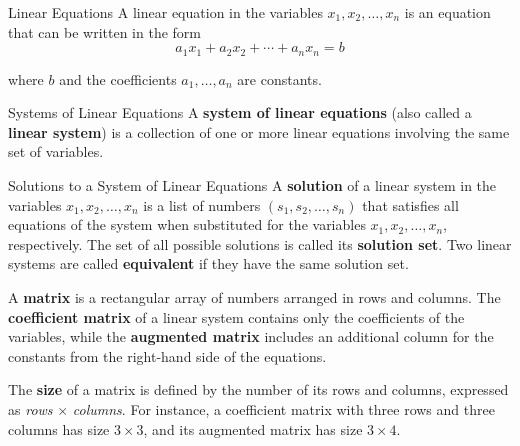 

\begin{definition}{Linear Equations} A linear equation in the variables $x_1, x_2, \ldots, x_n$ is an equation that can be written in the form
\[
a_1 x_1 + a_2 x_2 + \cdots + a_n x_n = b
\]

where $b$ and the coefficients $a_1, \ldots, a_n$ are constants.

\end{definition}

\begin{definition}{Systems of Linear Equations} A \textbf{system of linear equations} (also called a \textbf{linear system}) is a collection of one or more linear equations involving the same set of variables. \end{definition}

\begin{definition}{Solutions to a System of Linear Equations} A \textbf{solution} of a linear system in the variables $x_1, x_2, \ldots, x_n$ is a list of numbers $(s_1, s_2, \ldots, s_n)$ that satisfies all equations of the system when substituted for the variables $x_1, x_2, \ldots, x_n$, respectively. The set of all possible solutions is called its \textbf{solution set}. Two linear systems are called \textbf{equivalent} if they have the same solution set. \end{definition}

\begin{definition} A \textbf{matrix} is a rectangular array of numbers arranged in rows and columns. The \textbf{coefficient matrix} of a linear system contains only the coefficients of the variables, while the \textbf{augmented matrix} includes an additional column for the constants from the right-hand side of the equations. \end{definition}

\begin{definition} The \textbf{size} of a matrix is defined by the number of its rows and columns, expressed as \emph{rows} $\times$ \emph{columns}. For instance, a coefficient matrix with three rows and three columns has size $3 \times 3$, and its augmented matrix has size $3 \times 4$. \end{definition}


